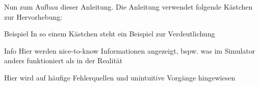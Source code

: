 Nun zum Aufbau dieser Anleitung. Die Anleitung verwendet folgende Kästchen zur Hervorhebung:
\begin{exampleblock}{Beispiel}
	In so einem Kästchen steht ein Beispiel zur Verdeutlichung
\end{exampleblock}

\begin{infoblock}{Info}
	Hier werden nice-to-know Informationen angezeigt, bspw. was im Simulator anders funktioniert als in der Realität
\end{infoblock}

\begin{warningblock}
	Hier wird auf häufige Fehlerquellen und unintuitive Vorgänge hingewiesen
\end{warningblock}

